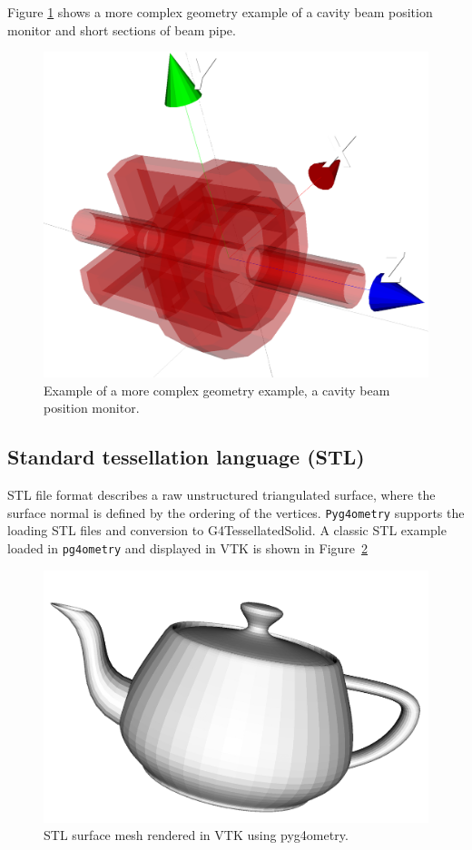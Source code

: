 \documentclass[a4paper,
               keeplastbox,   %
               ]{jacow}
\begin{document}
Figure \ref{fig:dipole} shows a more complex geometry example of a cavity beam position monitor and short sections of beam pipe.
\begin{figure}[!htb]
   \centering
   \includegraphics*[width=.8\columnwidth]{./examples/dipole.jpg}
   \caption{Example of a more complex geometry example, a cavity beam position monitor.}
   \label{fig:dipole}
\end{figure}

\subsection{Standard tessellation language (STL)}
STL file format describes a raw unstructured triangulated surface, where the surface normal is defined by the ordering of the vertices. \verb|Pyg4ometry| supports the loading 
STL files and conversion to G4TessellatedSolid. A classic STL example loaded in \verb|pg4ometry| and displayed in VTK is shown in Figure~\ref{fig:utahteapot}
\begin{figure}[!htb]
   \centering
   \includegraphics*[width=.6\columnwidth]{./examples/utahteapot.jpg}
   \caption{STL surface mesh rendered in VTK using pyg4ometry.}
   \label{fig:utahteapot}
\end{figure}
\end{document}
